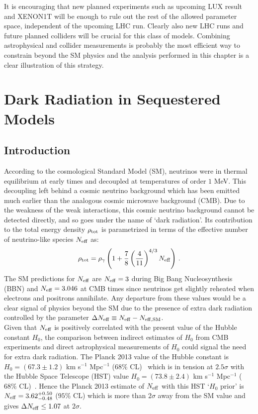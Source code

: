 \documentclass[12pt,a4paper]{book}
\begin{document}
It is encouraging that new planned experiments such as upcoming LUX result and XENON1T will be enough to rule out the rest of the allowed parameter space, independent of the upcoming LHC run. Clearly also new LHC runs and future planned colliders will be crucial for this class of models. Combining astrophysical and collider measurements is probably the most efficient way to constrain beyond the SM physics and the analysis performed in this chapter is a clear illustration of this strategy.

\chapter{Dark Radiation in Sequestered Models}
\label{chap:DR}

\section{Introduction}
\label{sec:DRIntroduction}

According to the cosmological Standard Model (SM), neutrinos were in thermal equilibrium at early times and decoupled at temperatures of order $1$ MeV. This decoupling left behind a cosmic neutrino background which has been emitted much earlier than the analogous cosmic microwave background (CMB). Due to the weakness of the weak interactions, this cosmic neutrino background cannot be detected directly, and so goes under the name of `dark radiation'. Its contribution to the total energy density $\rho_{\rm tot}$ is parametrized in terms of the effective number of neutrino-like species $N_{\rm eff}$ as:
\begin{align}
\rho_{\rm tot} = \rho_{\gamma} \left( 1 + \frac{7}{8}\left( \frac{4}{11} \right)^{4/3} N_{\rm eff} \right)\,.
\end{align}
The SM predictions for $N_{\rm eff}$ are $N_{\rm eff}=3$ during Big Bang Nucleosynthesis (BBN) and $N_{\rm eff}=3.046$ at CMB times since neutrinos get slightly reheated when electrons and positrons annihilate. Any departure from these values would be a clear signal of physics beyond the SM due to the presence of extra dark radiation controlled by the parameter $\Delta N_{\rm eff}\equiv N_{\rm eff} - N_{\rm eff, SM}$.\\

Given that $N_{\rm eff}$ is positively correlated with the present value of the Hubble constant $H_0$, the comparison between indirect estimates of $H_0$ from CMB experiments and direct astrophysical measurements of $H_0$ could signal the need for extra dark radiation. The Planck 2013 value of the Hubble constant is $H_0 = (67.3\pm 1.2)$ km s$^{-1}$ Mpc$^{-1}$ ($68\%$ CL)~\cite{Ade:2013zuv} which is in tension at $2.5\sigma$ with the Hubble Space Telescope (HST) value $H_0 = (73.8\pm 2.4)$ km s$^{-1}$ Mpc$^{-1}$ ($68\%$ CL)~\cite{Riess:2011yx}. Hence the Planck 2013 estimate of $N_{\rm eff}$ with this HST `$H_0$ prior' is $N_{\rm eff} = 3.62^{+0.50}_{-0.48}$ ($95\%$ CL) which is more than $2\sigma$ away from the SM value and gives $\Delta N_{\rm eff} \leq 1.07$ at $2\sigma$.\\
\end{document}
